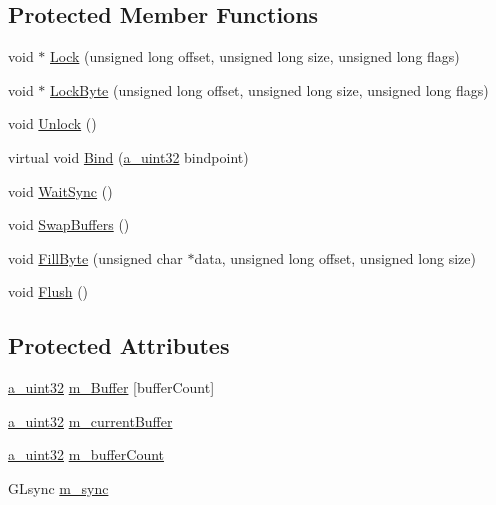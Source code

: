 \subsection*{Protected Member Functions}
\begin{DoxyCompactItemize}
\item 
void $\ast$ \hyperlink{class_agmd_1_1_g_l_buffer_af528936de0f248d8600f98a4a90b0690}{Lock} (unsigned long offset, unsigned long size, unsigned long flags)
\item 
void $\ast$ \hyperlink{class_agmd_1_1_g_l_buffer_af9af1f6412e317779012ab1e8b8fa392}{Lock\+Byte} (unsigned long offset, unsigned long size, unsigned long flags)
\item 
void \hyperlink{class_agmd_1_1_g_l_buffer_adf95328adee30f22c59f39bc4f04177e}{Unlock} ()
\item 
virtual void \hyperlink{class_agmd_1_1_g_l_buffer_a1e77bdd1dffe7eed3314dada721ef60a}{Bind} (\hyperlink{_common_defines_8h_a964296f9770051b9e4807b1f180dd416}{a\+\_\+uint32} bindpoint)
\item 
void \hyperlink{class_agmd_1_1_g_l_buffer_ab79847088a93b9e0c9ec18acea0dc614}{Wait\+Sync} ()
\item 
void \hyperlink{class_agmd_1_1_g_l_buffer_af88ce97bde11de88a1ca227af3257698}{Swap\+Buffers} ()
\item 
void \hyperlink{class_agmd_1_1_g_l_buffer_afad84215ec431ed1c275b062c76d9ee0}{Fill\+Byte} (unsigned char $\ast$data, unsigned long offset, unsigned long size)
\item 
void \hyperlink{class_agmd_1_1_g_l_buffer_abf3c8799242660a0e05ee7ece5355560}{Flush} ()
\end{DoxyCompactItemize}
\subsection*{Protected Attributes}
\begin{DoxyCompactItemize}
\item 
\hyperlink{_common_defines_8h_a964296f9770051b9e4807b1f180dd416}{a\+\_\+uint32} \hyperlink{class_agmd_1_1_g_l_buffer_a281b02c645aa1ff45ed8efa1b39b63a0}{m\+\_\+\+Buffer} \mbox{[}buffer\+Count\mbox{]}
\item 
\hyperlink{_common_defines_8h_a964296f9770051b9e4807b1f180dd416}{a\+\_\+uint32} \hyperlink{class_agmd_1_1_g_l_buffer_a6b438c680953a18ac2ae19a7913f596f}{m\+\_\+current\+Buffer}
\item 
\hyperlink{_common_defines_8h_a964296f9770051b9e4807b1f180dd416}{a\+\_\+uint32} \hyperlink{class_agmd_1_1_g_l_buffer_ab4d48ed43d7d9dc07952a89cdca3f87e}{m\+\_\+buffer\+Count}
\item 
G\+Lsync \hyperlink{class_agmd_1_1_g_l_buffer_a08b79b8ed0540dd4350254abe0e426bd}{m\+\_\+sync}
\end{DoxyCompactItemize}


